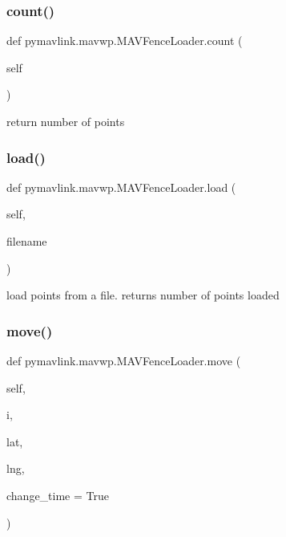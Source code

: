 \subsubsection{\texorpdfstring{count()}{count()}}
{\footnotesize\ttfamily def pymavlink.\+mavwp.\+M\+A\+V\+Fence\+Loader.\+count (\begin{DoxyParamCaption}\item[{}]{self }\end{DoxyParamCaption})}

\begin{DoxyVerb}return number of points\end{DoxyVerb}
 \mbox{\label{classpymavlink_1_1mavwp_1_1MAVFenceLoader_a31e6f593846fa95c782d1567215cb141}} 
\subsubsection{\texorpdfstring{load()}{load()}}
{\footnotesize\ttfamily def pymavlink.\+mavwp.\+M\+A\+V\+Fence\+Loader.\+load (\begin{DoxyParamCaption}\item[{}]{self,  }\item[{}]{filename }\end{DoxyParamCaption})}

\begin{DoxyVerb}load points from a file.
returns number of points loaded\end{DoxyVerb}
 \mbox{\label{classpymavlink_1_1mavwp_1_1MAVFenceLoader_a3a8c6237c42535dd031f28da0a9139ea}} 
\subsubsection{\texorpdfstring{move()}{move()}}
{\footnotesize\ttfamily def pymavlink.\+mavwp.\+M\+A\+V\+Fence\+Loader.\+move (\begin{DoxyParamCaption}\item[{}]{self,  }\item[{}]{i,  }\item[{}]{lat,  }\item[{}]{lng,  }\item[{}]{change\+\_\+time = {\ttfamily True} }\end{DoxyParamCaption})}

